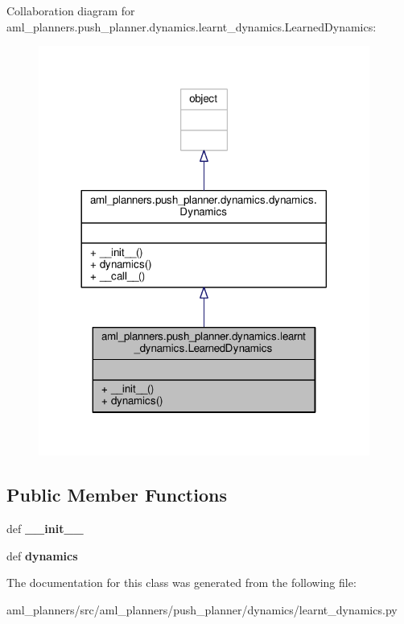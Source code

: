 Collaboration diagram for aml\-\_\-planners.\-push\-\_\-planner.\-dynamics.\-learnt\-\_\-dynamics.\-Learned\-Dynamics\-:
\nopagebreak
\begin{figure}[H]
\begin{center}
\leavevmode
\includegraphics[width=308pt]{classaml__planners_1_1push__planner_1_1dynamics_1_1learnt__dynamics_1_1_learned_dynamics__coll__graph}
\end{center}
\end{figure}
\subsection*{Public Member Functions}
\begin{DoxyCompactItemize}
\item 
\hypertarget{classaml__planners_1_1push__planner_1_1dynamics_1_1learnt__dynamics_1_1_learned_dynamics_a788c6dd487c5b8c1b76eb366b0240bf9}{def {\bfseries \-\_\-\-\_\-init\-\_\-\-\_\-}}\label{classaml__planners_1_1push__planner_1_1dynamics_1_1learnt__dynamics_1_1_learned_dynamics_a788c6dd487c5b8c1b76eb366b0240bf9}

\item 
\hypertarget{classaml__planners_1_1push__planner_1_1dynamics_1_1learnt__dynamics_1_1_learned_dynamics_a789eccdf00110cd2b3de786010fd54fb}{def {\bfseries dynamics}}\label{classaml__planners_1_1push__planner_1_1dynamics_1_1learnt__dynamics_1_1_learned_dynamics_a789eccdf00110cd2b3de786010fd54fb}

\end{DoxyCompactItemize}


The documentation for this class was generated from the following file\-:\begin{DoxyCompactItemize}
\item 
aml\-\_\-planners/src/aml\-\_\-planners/push\-\_\-planner/dynamics/learnt\-\_\-dynamics.\-py\end{DoxyCompactItemize}
